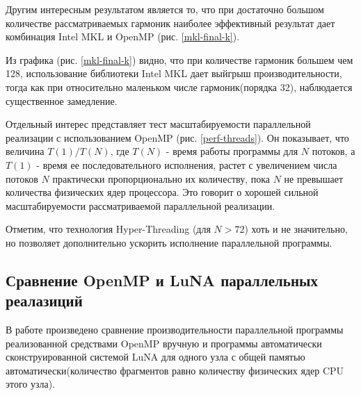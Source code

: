 Другим интересным результатом является то, что при достаточно большом количестве рассматриваемых гармоник
наиболее эффективный результат дает комбинация Intel MKL и OpenMP (рис. \ref{mkl-final-k}).

Из графика (рис. \ref{mkl-final-k}) видно, что при количестве гармоник большем чем 128, использование библиотеки Intel MKL
дает выйгрыш производительности, тогда как при относительно маленьком числе гармоник(порядка 32), наблюдается существенное замедление.


Отдельный интерес представляет тест масштабируемости параллельной реализации с использованием OpenMP (рис. \ref{perf-threads}).
Он показывает, что величина $T(1)/T(N)$, где $T(N)$ - время работы программы для $N$ потоков, а $T(1)$ - время ее последовательного исполнения, растет с увеличением числа потоков $N$ практически пропорционально их количеству, пока $N$ не превышает количества физических ядер процессора. Это говорит о хорошей сильной масштабируемости рассматриваемой параллельной реализации.


Отметим, что технология Hyper-Threading (для $N>72$) хоть и не значительно, но позволяет дополнительно ускорить исполнение параллельной программы.

\subsection{Сравнение OpenMP и LuNA параллельных реалазиций}
В работе произведено сравнение производительности параллельной программы реализованной средствами OpenMP вручную
и программы автоматически сконструированной системой LuNA для одного узла с общей памятью автоматически(количество фрагментов
равно количеству физических ядер CPU этого узла).

